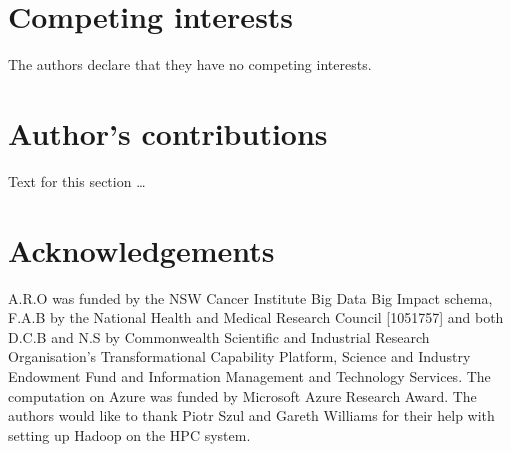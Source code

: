\documentclass{bmcart}
\begin{document}

\begin{backmatter}

\section*{Competing interests}
  The authors declare that they have no competing interests.

\section*{Author's contributions}
    Text for this section \ldots

\section*{Acknowledgements}
  A.R.O was funded by the NSW Cancer Institute Big Data Big Impact schema, F.A.B by the National Health and Medical Research Council [1051757] and both D.C.B and N.S by Commonwealth Scientific and Industrial Research Organisation's Transformational Capability Platform, Science and Industry Endowment Fund and Information Management and Technology Services. The computation on Azure was funded by Microsoft Azure Research Award. 
The authors would like to thank Piotr Szul and Gareth Williams for their help with setting up Hadoop on the HPC system.



\end{backmatter}
\end{document}
